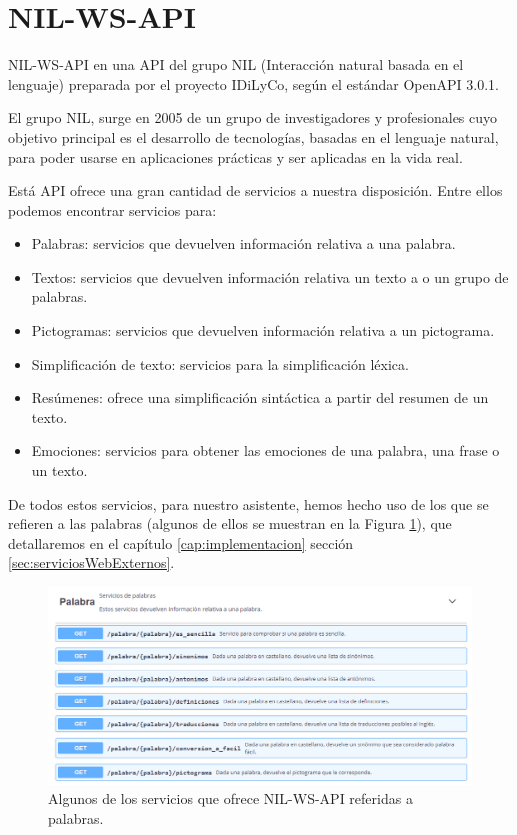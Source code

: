 \section{NIL-WS-API}\label{sec:nilws}

NIL-WS-API en una API del grupo NIL (Interacción natural basada en el lenguaje) preparada por el proyecto IDiLyCo, según el estándar OpenAPI 3.0.1. 

El grupo NIL, surge en 2005 de un grupo de investigadores y profesionales cuyo objetivo principal es el desarrollo de tecnologías, basadas en el lenguaje natural, para poder usarse en aplicaciones prácticas y ser aplicadas en la vida real. 

Está API ofrece una gran cantidad de servicios a nuestra disposición. Entre ellos podemos encontrar servicios para:


\begin{itemize}
	\item Palabras: servicios que devuelven información relativa a una palabra.
	\item Textos: servicios que devuelven información relativa  un texto a o un grupo de palabras.
	\item Pictogramas: servicios que devuelven información relativa a un pictograma.
	\item Simplificación de texto: servicios para la simplificación léxica.
	\item Resúmenes: ofrece una simplificación sintáctica a partir del resumen de un texto.
	\item Emociones: servicios para obtener las emociones de una palabra, una frase o un texto. 
\end{itemize}

De todos estos servicios, para nuestro asistente, hemos hecho uso de los que se refieren a las palabras (algunos de ellos se muestran en la Figura \ref{fig:apiNILWS}), que detallaremos en el capítulo \ref{cap:implementacion} sección \ref{sec:serviciosWebExternos}.

	\begin{figure}[h!]
	\centering
	
	
	\includegraphics[scale=0.7]{Imagenes/Figuras/apiNil}
	
	
	\caption{Algunos de los servicios que ofrece NIL-WS-API referidas a palabras.}
	\label{fig:apiNILWS}
\end{figure}
